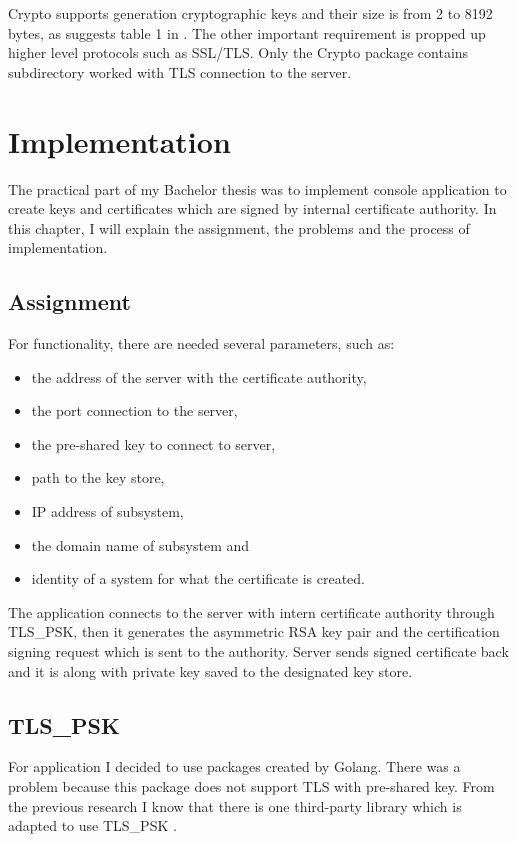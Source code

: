 \documentclass[
  twoside, 12pt, 
  printed, %
  notable,   %
  lof,     %
  lot,     %
]{fithesis3}
\begin{document}
Crypto supports generation cryptographic keys and their size is from 2 to 8192 bytes, as suggests 
table 1 in \cite{hinek2008security}. The other important requirement is propped up higher level 
protocols such as SSL/TLS. Only the Crypto package contains subdirectory worked with TLS connection 
to the server.

\chapter{Implementation}
The practical part of my Bachelor thesis was to implement console application to create keys and 
certificates which are signed by internal certificate authority. In this chapter, I will explain the 
assignment, the problems and the process of implementation. 

\section{Assignment}
For functionality, there are needed several parameters, such as:
\begin{itemize}[leftmargin=2em,rightmargin=1em,itemsep=0.75\parskip,parsep=0em,topsep=0em,partopsep=0em]
\item the address of the server with the certificate authority,
\item the port connection to the server,
\item the pre-shared key to connect to server,
\item path to the key store,
\item IP address of subsystem,
\item the domain name of subsystem and 
\item identity of a system for what the certificate is created.
\end{itemize}
\vskip 0.1in
The application connects to the server with intern certificate authority through 
TLS\_PSK, then it generates the asymmetric RSA key pair and the certification signing 
request which is sent to the authority. Server sends signed certificate back and it is 
along with private key saved to the designated key store.

\section{TLS\_PSK}
For application I decided to use packages created by Golang. There was a problem 
because this package does not support TLS with pre-shared key. From the previous 
research I know that there is one third-party library which is adapted to use TLS\_PSK 
\cite{raff}. 
\end{document}
